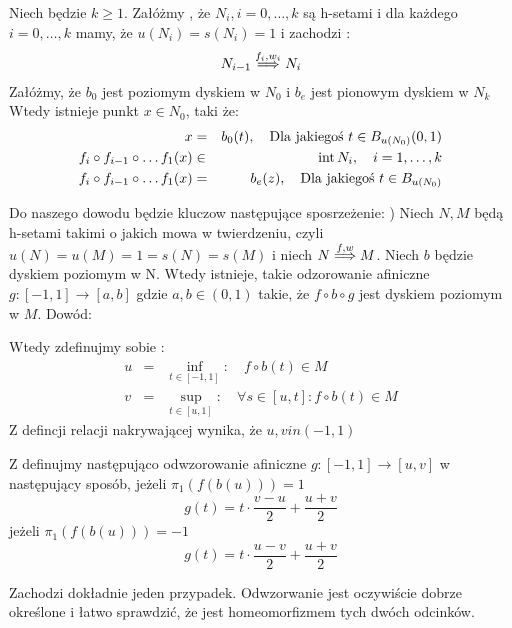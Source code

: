 \begin{theorem}
	Niech będzie $k \geq 1 $. Załóżmy , że $N_i, i = 0, \dots ,k $ są h-setami
	i dla każdego $ i = 0, \dots ,k $ mamy, że $ u(N_i) = s(N_i) = 1 $ i zachodzi :
	\begin{eqnarray*}
  		N_{i-1} \stackrel{f_i,w_i}{\Longrightarrow} N_i
	\end{eqnarray*}
	Załóżmy, że $b_0$ jest poziomym dyskiem w $N_0$ i $b_e$ jest pionowym dyskiem
	w $ N_k$ 
	Wtedy istnieje punkt $ x \in  N_0$, taki  że:
	\begin{eqnarray*}
   	x&=&b_0(t), \quad \mbox{Dla jakiegoś } t \in B_{u(N_0)}(0,1) \\
    f_i \circ f_{i-1} \circ \dots f_1(x) &\in &{\rm int}\, N_i, \quad i = 1, \dots , k \\
    f_i \circ f_{i-1} \circ \dots f_1(x) &=& b_e(z) ,\quad \mbox{Dla jakiegoś } t \in B_{u(N_0)}
	\end{eqnarray*}

\end{theorem}

Do naszego dowodu będzie kluczow następujące sposrzeżenie:
) Niech $N,M$ będą h-setami takimi o jakich mowa w twierdzeniu, czyli $ u(N)=u(M) = 1 = s(N) = s(M) $
i niech $ N \stackrel{f,w}{\Longrightarrow} M$. Niech $b$ będzie dyskiem poziomym w N.
Wtedy istnieje, takie odzorowanie afiniczne $ g:[-1,1] \to [a,b] $ gdzie $ a,b  \in (0,1) $ 
takie, że $ f \circ b \circ g $ jest dyskiem poziomym w $M$.
Dowód:

Wtedy zdefinujmy sobie :
\begin{eqnarray*}
  		u &=& \inf_{ t \in [-1,1]} : \quad f \circ b(t) \in M \\
  		v &=& \sup_{ t \in [u,1]} :  \quad \forall s \in [u,t] :  f \circ b(t) \in M
	\end{eqnarray*}
Z defincji relacji nakrywającej wynika, że $u,v in (-1,1)$

Z definujmy następująco odwzorowanie afiniczne $ g : [-1,1] \to [u,v] $ w następujący sposób, jeżeli
$ \pi_1(f(b(u))) = 1 $ 
\begin{equation}
      g(t) = t \cdot \frac{v-u}{2} + \frac{u+v}{2}
\end{equation}
jeżeli $\pi_1( f(b(u))) = -1 $ 
\begin{equation}
      g(t) = t \cdot \frac{u -v}{2} + \frac{u+v}{2}
\end{equation}


Zachodzi dokładnie jeden przypadek.
Odwzorwanie jest oczywiście dobrze określone i łatwo sprawdzić, że jest homeomorfizmem 
tych dwóch odcinków.

